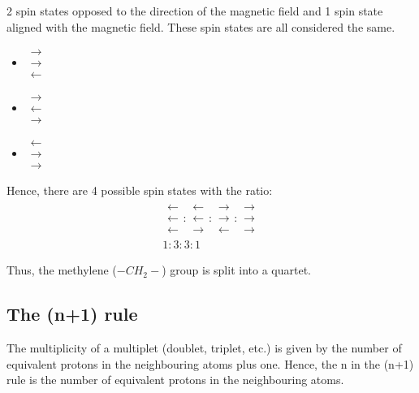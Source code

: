 \documentclass[11pt]{article}
\begin{document}
2 spin states opposed to the direction of the magnetic field and 1 spin state aligned with the magnetic field. These spin states are all considered the same.
\begin{itemize}
\item \(\mathrel{\substack{\textstyle\rightarrow \\[-0.6ex] \textstyle\rightarrow \\[-0.6ex] \textstyle\leftarrow}}\)
\item \(\mathrel{\substack{\textstyle\rightarrow \\[-0.6ex] \textstyle\leftarrow \\[-0.6ex] \textstyle\rightarrow}}\)
\item \(\mathrel{\substack{\textstyle\leftarrow \\[-0.6ex] \textstyle\rightarrow \\[-0.6ex] \textstyle\rightarrow}}\)
\end{itemize}

Hence, there are 4 possible spin states with the ratio:
\begin{align*}
\mathrel{\substack{\textstyle\leftarrow \\[-0.6ex] \textstyle\leftarrow \\[-0.6ex] \textstyle\leftarrow}} : \mathrel{\substack{\textstyle\leftarrow \\[-0.6ex] \textstyle\leftarrow \\[-0.6ex] \textstyle\rightarrow}} : \mathrel{\substack{\textstyle\rightarrow \\[-0.6ex] \textstyle\rightarrow \\[-0.6ex] \textstyle\leftarrow}} : \mathrel{\substack{\textstyle\rightarrow \\[-0.6ex] \textstyle\rightarrow \\[-0.6ex] \textstyle\rightarrow}} \\ 1 : 3 : 3 : 1
\end{align*}

Thus, the methylene (\(-CH_2-\)) group is split into a quartet.

\subsection{The (n+1) rule}
\label{sec:org0747e79}
The multiplicity of a multiplet (doublet, triplet, etc.) is given by the number of equivalent protons in the neighbouring atoms plus one. Hence, the n in the (n+1) rule is the number of equivalent protons in the neighbouring atoms.
\end{document}
